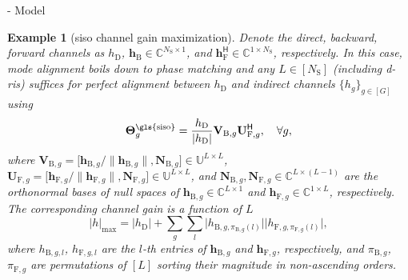 \documentclass[journal]{IEEEtran}
\newtheorem{example}{Example}
\begin{document}
\begin{section}{- Model}

	\begin{example}[\gls{siso} channel gain maximization]\label{eg:siso_gain}
		Denote the direct, backward, forward channels as $h_\mathrm{D}$, $\mathbf{h}_\mathrm{B} \in \mathbb{C}^{N_\mathrm{S} \times 1}$, and $\mathbf{h}_\mathrm{F}^\mathsf{H} \in \mathbb{C}^{1 \times N_\mathrm{S}}$, respectively.
		In this case, mode alignment boils down to phase matching and any $L \in [N_\mathrm{S}]$ (including \gls{d}-\gls{ris}) suffices for perfect alignment between $h_\mathrm{D}$ and indirect channels $\{h_g\}_{g \in [G]}$ using
		\begin{equation}
			\mathbf{\Theta}_g^\textnormal{\gls{siso}} = \frac{h_\mathrm{D}}{\lvert h_\mathrm{D} \rvert} \mathbf{V}_{\mathrm{B},g} \mathbf{U}_{\mathrm{F},g}^\mathsf{H}, \quad \forall g,
			\label{eq:scattering_siso}
		\end{equation}
		where $\mathbf{V}_{\mathrm{B},g} = \bigl[\mathbf{h}_{\mathrm{B},g}/\lVert \mathbf{h}_{\mathrm{B},g} \rVert, \mathbf{N}_{\mathrm{B},g}\bigr] \in \mathbb{U}^{L \times L}$, $\mathbf{U}_{\mathrm{F},g} = \bigl[\mathbf{h}_{\mathrm{F},g}/\lVert \mathbf{h}_{\mathrm{F},g} \rVert, \mathbf{N}_{\mathrm{F},g}\bigr] \in \mathbb{U}^{L \times L}$, and $\mathbf{N}_{\mathrm{B},g}, \mathbf{N}_{\mathrm{F},g} \in \mathbb{C}^{L \times (L-1)}$ are the orthonormal bases of null spaces of $\mathbf{h}_{\mathrm{B},g} \in \mathbb{C}^{L \times 1}$ and $\mathbf{h}_{\mathrm{F},g} \in \mathbb{C}^{1 \times L}$, respectively.
		The corresponding channel gain is a function of $L$
		\begin{equation}
			\lvert h \rvert _{\max} = \lvert h_\mathrm{D} \rvert + \sum_g \sum_l \lvert h_{\mathrm{B},g,\pi_{\mathrm{B},g}(l)} \rvert \lvert h_{\mathrm{F},g,\pi_{\mathrm{F},g}(l)} \rvert,
			\label{eq:gain_siso}
		\end{equation}
		where $h_{\mathrm{B},g,l}$, $h_{\mathrm{F},g,l}$ are the $l$-th entries of $\mathbf{h}_{\mathrm{B},g}$ and $\mathbf{h}_{\mathrm{F},g}$, respectively, and $\pi_{\mathrm{B},g}$, $\pi_{\mathrm{F},g}$ are permutations of $[L]$ sorting their magnitude in non-ascending orders.

\end{example}
\end{section}
\end{document}
